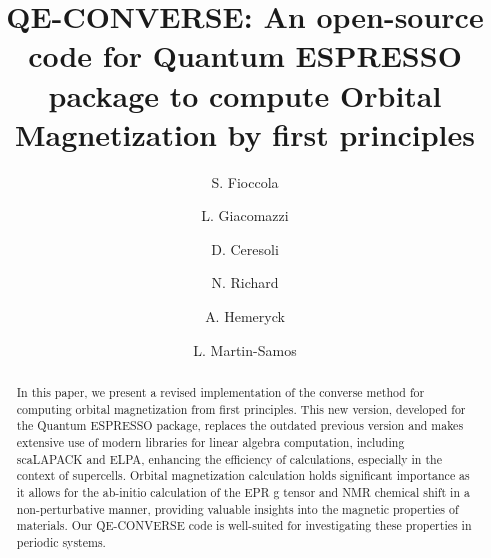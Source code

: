 \documentclass[final,3p,times,twocolumn]{elsarticle}
\begin{document}
\begin{frontmatter}



\title{{\selectfont
QE-CONVERSE}: { An open-source code for Quantum ESPRESSO package to compute Orbital Magnetization by first principles }}


\author[a]{S. Fioccola}
\author[b]{L. Giacomazzi}
\author[c]{D. Ceresoli}
\author[d]{N. Richard}
\author[a]{A. Hemeryck}
\author[b]{L. Martin-Samos}


\address[a]{LAAS-CNRS, Université de Toulouse, CNRS, Toulouse, France;}
\address[b]{CNR-IOM, Istituto Officina dei Materiali, National Research Council of Italy, c/o SISSA, via Bonomea 265, Trieste, Italy}
\address[c]{CNR-SCITEC – Istituto di Scienze e Tecnologie Chimiche “G. Natta”, National Research Council of Italy, via C. Golgi 19, Milano 20133, Italy}
\address[d]{CEA, DAM, DIF, Arpajon, France}


\begin{abstract}
In this paper, we present a revised implementation of the converse method for computing orbital magnetization from first principles. This new version, developed for the Quantum ESPRESSO package, replaces the outdated previous version and makes extensive use of modern libraries for linear algebra computation, including scaLAPACK and ELPA, enhancing the efficiency of calculations, especially in the context of supercells. Orbital magnetization calculation  holds significant importance as it allows for the ab-initio calculation of the EPR g tensor and NMR chemical shift in a non-perturbative manner, providing valuable insights into the magnetic properties of materials.  Our {\selectfont
QE-CONVERSE} code is well-suited for investigating these properties in periodic systems.


\end{abstract}
\end{frontmatter}
\end{document}
